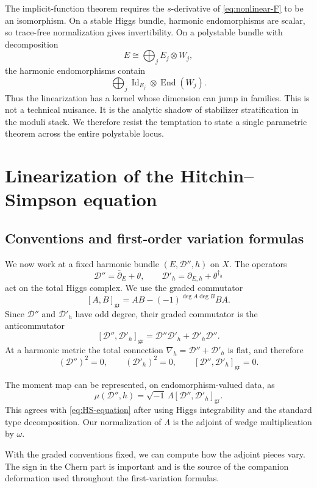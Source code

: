 \documentclass[11pt,reqno]{amsart}
\theoremstyle{definition}
\theoremstyle{remark}
\newcommand{\cD}{\mathcal D}
\newcommand{\End}{\operatorname{End}}
\newcommand{\Id}{\operatorname{Id}}
\newcommand{\ddbar}{\overline\partial}
\begin{document}
The implicit-function theorem requires the $s$-derivative of \eqref{eq:nonlinear-F} to be an isomorphism.  On a stable Higgs bundle, harmonic endomorphisms are scalar, so trace-free normalization gives invertibility.  On a polystable bundle with decomposition
\[
  E\cong\bigoplus_j E_j\otimes W_j,
\]
the harmonic endomorphisms contain
\[
  \bigoplus_j \Id_{E_j}\otimes\End(W_j).
\]
Thus the linearization has a kernel whose dimension can jump in families.  This is not a technical nuisance.  It is the analytic shadow of stabilizer stratification in the moduli stack.  We therefore resist the temptation to state a single parametric theorem across the entire polystable locus.

\section{Linearization of the Hitchin--Simpson equation}\label{sec:linearization}

\subsection{Conventions and first-order variation formulas}

We now work at a fixed harmonic bundle $(E,\cD'',h)$ on $X$.  The operators
\[
  \cD''=\ddbar_E+\theta,
  \qquad
  \cD'_h=\partial_{E,h}+\theta^{\dagger_h}
\]
act on the total Higgs complex.  We use the graded commutator
\[
  [A,B]_{\mathrm{gr}}
  =AB-(-1)^{\deg A\deg B}BA.
\]
Since $\cD''$ and $\cD'_h$ have odd degree, their graded commutator is the anticommutator
\[
  [\cD'',\cD'_h]_{\mathrm{gr}}
  =\cD''\cD'_h+\cD'_h\cD''.
\]
At a harmonic metric the total connection $\nabla_h=\cD''+\cD'_h$ is flat, and therefore
\begin{equation}\label{eq:harmonic-bicomplex}
  (\cD'')^2=0,
  \qquad
  (\cD'_h)^2=0,
  \qquad
  [\cD'',\cD'_h]_{\mathrm{gr}}=0.
\end{equation}

The moment map can be represented, on endomorphism-valued data, as
\begin{equation}\label{eq:moment-graded}
  \mu(\cD'',h)
  =\sqrt{-1}\,\Lambda
  [\cD'',\cD'_h]_{\mathrm{gr}}.
\end{equation}
This agrees with \eqref{eq:HS-equation} after using Higgs integrability and the standard type decomposition.  Our normalization of $\Lambda$ is the adjoint of wedge multiplication by $\omega$.


With the graded conventions fixed, we can compute how the adjoint pieces vary.  The sign in the Chern part is important and is the source of the companion deformation used throughout the first-variation formulas.
\end{document}
